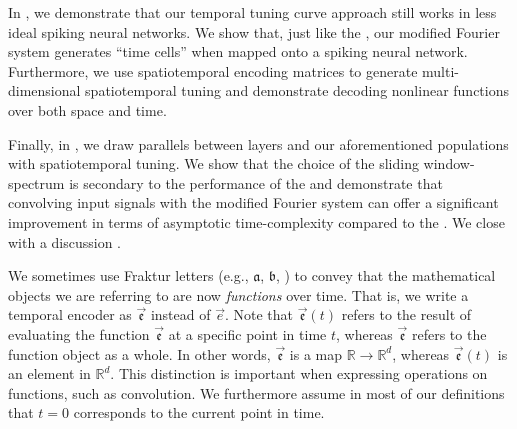 In , we demonstrate that our temporal tuning curve approach still works in less ideal spiking neural networks.
We show that, just like the \LDN, our modified Fourier system generates \enquote{time cells} when mapped onto a spiking neural network.
Furthermore, we use spatiotemporal encoding matrices to generate multi-dimensional spatiotemporal tuning and demonstrate decoding nonlinear functions over both space and time.

Finally, in , we draw parallels between \LMU layers and our aforementioned \NEF populations with spatiotemporal tuning.
We show that the choice of the sliding window-spectrum is secondary to the performance of the \LMU and demonstrate that convolving input signals with the modified Fourier system can offer a significant improvement in terms of asymptotic time-complexity compared to the \LDN.
We close with a discussion .

\begin{Notation}
We sometimes use Fraktur letters (e.g., $\mathfrak{a}$, $\mathfrak{b}$, \textellipsis) to convey that the mathematical objects we are referring to are now \emph{functions} over time.
That is, we write a temporal encoder as $\vec{\mathfrak{e}}$ instead of $\vec e$.
Note that $\vec{\mathfrak{e}}(t)$ refers to the result of evaluating the function $\vec{\mathfrak{e}}$ at a specific point in time $t$, whereas $\vec{\mathfrak{e}}$ refers to the function object as a whole.
In other words, $\vec{\mathfrak{e}}$ is a map $\mathbb{R} \longrightarrow \mathbb{R}^d$, whereas $\vec{\mathfrak{e}}(t)$ is an element in $\mathbb{R}^d$.
This distinction is important when expressing operations on functions, such as convolution.
We furthermore assume in most of our definitions that $t = 0$ corresponds to the current point in time.
\end{Notation}
